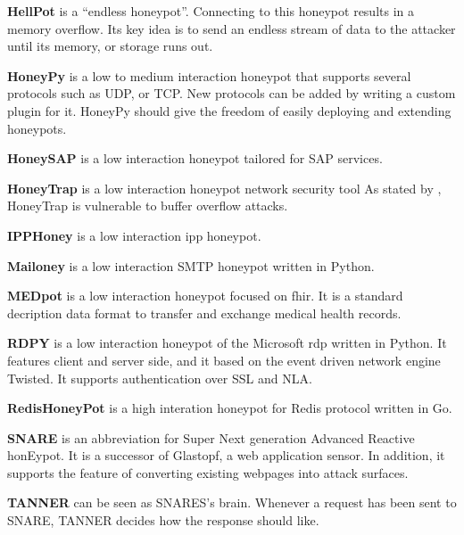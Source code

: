 \textbf{HellPot} \cite{hellpot2021} is a \enquote{endless honeypot}.
Connecting to this honeypot results in a memory overflow.
Its key idea is to send an endless stream of data to the attacker until its memory, or storage runs out.

\textbf{HoneyPy} \cite{honeysap2021} is a low to medium interaction honeypot that supports several protocols such as UDP, or TCP.
New protocols can be added by writing a custom plugin for it.
HoneyPy should give the freedom of easily deploying and extending honeypots.

\textbf{HoneySAP} \cite{honeysap2021} is a low interaction honeypot tailored for SAP services.

\textbf{HoneyTrap} \cite{honeytrap2021} is a low interaction honeypot network security tool
As stated by \citet*{honeytrap2021}, HoneyTrap is vulnerable to buffer overflow attacks.

\textbf{IPPHoney} \cite{ipphoney2021} is a low interaction \ac{ipp} honeypot.

\textbf{Mailoney} is a low interaction SMTP honeypot written in Python.

\textbf{MEDpot} \cite{medpot2021} is a low interaction honeypot focused on \ac{fhir}. It is a standard decription data format to transfer and exchange medical health records.

\textbf{RDPY} \cite{rdpy2021} is a low interaction honeypot of the Microsoft \ac{rdp} written in Python.
It features client and server side, and it based on the event driven network engine Twisted.
It supports authentication over SSL and NLA.

\textbf{RedisHoneyPot} is a high interation honeypot for Redis protocol written in Go.

\textbf{SNARE} \cite{snare2021} is an abbreviation for Super Next generation Advanced Reactive honEypot.
It is a successor of Glastopf, a web application sensor.
In addition, it supports the feature of converting existing webpages into attack surfaces.

\textbf{TANNER} \cite{tanner2021} can be seen as SNARES's brain.
Whenever a request has been sent to SNARE, TANNER decides how the response should like.

